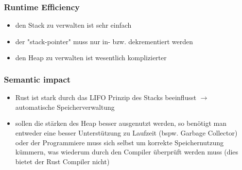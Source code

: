 \documentclass[a4paper,12pt]{article}
\begin{document}
\subsubsection*{Runtime Efficiency} 
	\begin{itemize}
	  \item den Stack zu verwalten ist sehr einfach
	  \item der "stack-pointer" muss nur in- bzw. dekrementiert werden
	  \item den Heap zu verwalten ist wesentlich komplizierter
	\end{itemize}

\subsubsection*{Semantic impact} 
	\begin{itemize}
	  \item Rust ist stark durch das LIFO Prinzip des Stacks beeinflusst $\rightarrow$ automatische Speicherverwaltung
	  \item sollen die stärken des Heap besser ausgenutzt werden, so benötigt man entweder eine besser Unterstützung zu Laufzeit (bspw. Garbage Collector) oder der Programmiere muss sich selbst um korrekte Speichernutzung kümmern, was wiederum durch den Compiler überprüft werden muss (dies bietet der Rust Compiler nicht)
	\end{itemize}

\newpage
\end{document}
